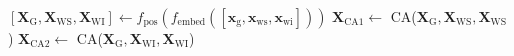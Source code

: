 \begin{algorithm}
\begin{algorithmic}[1]
\vspace{0.5em}
\State \hspace{0.2cm} $[\mathbf{X}_\text{G},\mathbf{X}_\text{WS}, \mathbf{X}_\text{WI}]\gets f_{\text{pos}}\left(f_{\text{embed}}\left(\left[\mathbf{x}_\text{g}, \mathbf{x}_\text{ws}, \mathbf{x}_\text{wi}\right]\right)\right)$
\vspace{0.5em}
\State \hspace{0.2cm} $\mathbf{X}_{\text{CA1}}\gets$ CA($\mathbf{X}_{\text{G}}, \mathbf{X}_{\text{WS}}, \mathbf{X}_{\text{WS}}$)
\vspace{0,5em}
\State \hspace{0.2cm} $\mathbf{X}_{\text{CA2}}\gets$ CA($\mathbf{X}_{\text{G}}, \mathbf{X}_{\text{WI}}, \mathbf{X}_{\text{WI}}$)

\end{algorithmic}
\end{algorithm}
